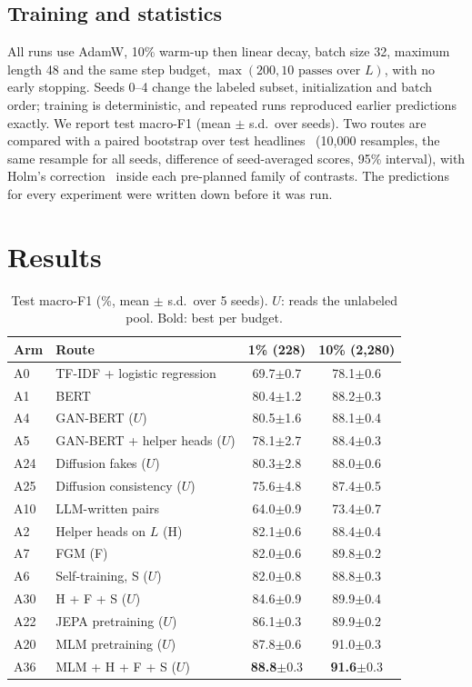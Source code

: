 \documentclass[conference]{IEEEtran}
\newcommand{\A}[1]{\textsf{#1}}                         %
\newcommand{\pmsd}[1]{{\scriptsize$\pm$#1}}
\begin{document}
\subsection{Training and statistics}
All runs use AdamW, 10\% warm-up then linear decay, batch size 32, maximum length 48 and the same step budget, $\max(200, 10 \text{ passes over } L)$, with no early stopping. Seeds 0--4 change the labeled subset, initialization and batch order; training is deterministic, and repeated runs reproduced earlier predictions exactly. We report test macro-F1 (mean $\pm$ s.d.\ over seeds). Two routes are compared with a paired bootstrap over test headlines~\cite{berg2012empirical} (10,000 resamples, the same resample for all seeds, difference of seed-averaged scores, 95\% interval), with Holm's correction~\cite{holm1979simple} inside each pre-planned family of contrasts. The predictions for every experiment were written down before it was run.

\section{Results}

\begin{table}[t]
\centering
\caption{Test macro-F1 (\%, mean $\pm$ s.d.\ over 5 seeds). $U$: reads the unlabeled pool. Bold: best per budget.}
\label{tab:main}
\footnotesize
\setlength{\tabcolsep}{4pt}
\begin{tabular}{llcc}
\toprule
Arm & Route & 1\% (228) & 10\% (2,280) \\
\midrule
\A{A0} & TF-IDF + logistic regression & 69.7\pmsd{0.7} & 78.1\pmsd{0.6} \\
\A{A1} & BERT & 80.4\pmsd{1.2} & 88.2\pmsd{0.3} \\
\midrule
\A{A4} & GAN-BERT ($U$) & 80.5\pmsd{1.6} & 88.1\pmsd{0.4} \\
\A{A5} & GAN-BERT + helper heads ($U$) & 78.1\pmsd{2.7} & 88.4\pmsd{0.3} \\
\A{A24} & Diffusion fakes ($U$) & 80.3\pmsd{2.8} & 88.0\pmsd{0.6} \\
\A{A25} & Diffusion consistency ($U$) & 75.6\pmsd{4.8} & 87.4\pmsd{0.5} \\
\A{A10} & LLM-written pairs & 64.0\pmsd{0.9} & 73.4\pmsd{0.7} \\
\A{A2} & Helper heads on $L$ (H) & 82.1\pmsd{0.6} & 88.4\pmsd{0.4} \\
\A{A7} & FGM (F) & 82.0\pmsd{0.6} & 89.8\pmsd{0.2} \\
\A{A6} & Self-training, S ($U$) & 82.0\pmsd{0.8} & 88.8\pmsd{0.3} \\
\A{A30} & H + F + S ($U$) & 84.6\pmsd{0.9} & 89.9\pmsd{0.4} \\
\midrule
\A{A22} & JEPA pretraining ($U$) & 86.1\pmsd{0.3} & 89.9\pmsd{0.2} \\
\A{A20} & MLM pretraining ($U$) & 87.8\pmsd{0.6} & 91.0\pmsd{0.3} \\
\A{A36} & MLM + H + F + S ($U$) & \textbf{88.8}\pmsd{0.3} & \textbf{91.6}\pmsd{0.3} \\
\bottomrule
\end{tabular}
\end{table}
\end{document}
